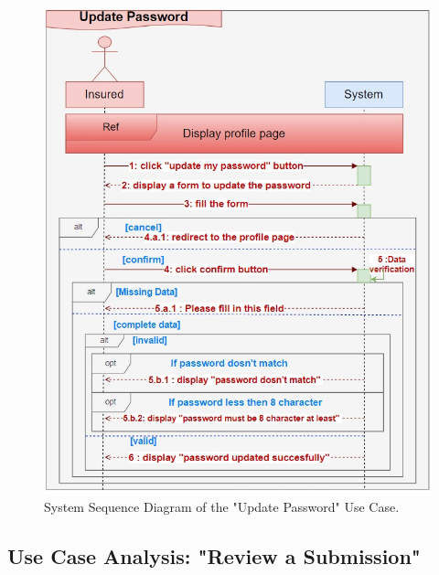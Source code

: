 \clearpage

\begin{figure}[h!]
    \centering
    \includegraphics[width=1\textwidth]{figures/sequpdate_password.png}
    \caption{System Sequence Diagram of the "Update Password" Use Case.}
\end{figure}
\clearpage

\subsection{Use Case Analysis: "Review a Submission"}
